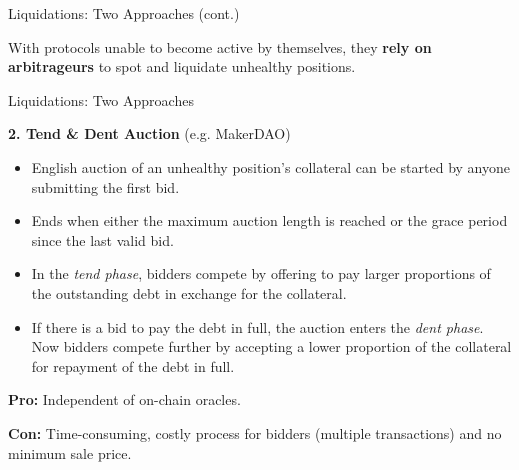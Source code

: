 \documentclass[]{beamer}
\begin{document}
\begin{frame}{Liquidations: Two Approaches (cont.)}

With protocols unable to become active by themselves, they \textbf{rely on arbitrageurs} to spot and liquidate unhealthy positions.


\end{frame}


\begin{frame}{Liquidations: Two Approaches }


\textbf{2. Tend \& Dent Auction} (e.g. MakerDAO) \cite{Gervais21DeFiLiquidations}
\vspace{0.2em}
\begin{itemize}
\item English auction of an unhealthy position’s collateral can be started by anyone submitting the first bid.
\item Ends when either the maximum auction length is reached or the grace period since the last valid bid.
\item In the \emph{tend phase}, bidders compete by offering to pay larger proportions of the outstanding debt in exchange for the collateral.
\item If there is a bid to pay the debt in full, the auction enters the \textit{dent phase}. Now bidders compete further by accepting a lower proportion of the collateral for repayment of the debt in full.
\end{itemize}
\vspace{0.5em}

\textbf{Pro: }Independent of on-chain oracles.

\textbf{Con: }Time-consuming, costly process for bidders (multiple transactions) and no minimum sale price.


	
\end{frame}
\end{document}
